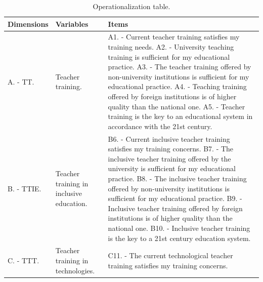 \documentclass{textolivre}
\begin{document}
\begin{longtable}{p{}p{}p{}}
\caption{Operationalization table.}
\label{tab1}
\\ 
\toprule 
Dimensions & Variables & Items \\ 
\midrule
\arrayrulecolor[gray]{.7}
A. - TT. \newline \textcite{nieva2016} \newline \textcite{rodriguez2021} & Teacher training. & 
\multicolumn{1}{p{0.5\textwidth}}{A1. - Current teacher training satisfies my training needs. \newline
A2. - University teaching training is sufficient for my educational practice. \newline
A3. - The teacher training offered by non-university institutions is sufficient for my educational practice. \newline
A4. - Teaching training offered by foreign institutions is of higher quality than the national one. \newline
A5. - Teacher training is the key to an educational system in accordance with the 21st century.}
\\
\midrule
B. - TTIE. \newline \textcite{booth2000} \newline \textcite{arnaiz2019} \newline \textcite{moreno2020} & Teacher training in inclusive education. & \multicolumn{1}{p{0.5\textwidth}}{B6. - Current inclusive teacher training satisfies my training concerns. \newline
B7. - The inclusive teacher training offered by the university is sufficient for my educational practice. \newline
B8. - The inclusive teacher training offered by non-university institutions is sufficient for my educational practice. \newline
B9. - Inclusive teacher training offered by foreign institutions is of higher quality than the national one. \newline
B10. - Inclusive teacher training is the key to a 21st century education system.}
\\
\midrule
C. - TTT. \newline \textcite{talavera2020} \newline \textcite{dussel2020} \newline \textcite{suarez2020} & Teacher training in technologies. & \multicolumn{1}{p{0.5\textwidth}}{C11. - The current technological teacher training satisfies my training concerns. \newline
}
\end{longtable}
\end{document}
